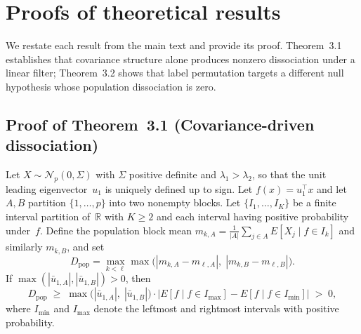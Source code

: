 \documentclass[hidelinks]{siamart251216}
\newcommand{\R}{\mathbb{R}}
\newcommand{\settheoremnum}[1]{\renewcommand{\thetheorem}{#1}}
\begin{document}
\section{Proofs of theoretical results}\label{supp:proofs}

We restate each result from the main text and provide its proof.
Theorem~3.1 establishes that covariance structure alone produces
nonzero dissociation under a linear filter; Theorem~3.2 shows that
label permutation targets a different null hypothesis whose population
dissociation is zero.

\subsection{Proof of Theorem~3.1 (Covariance-driven dissociation)}

\settheoremnum{3.1}
\begin{theorem}
  Let $X \sim \mathcal{N}_p(0, \Sigma)$ with $\Sigma$ positive definite
  and $\lambda_1 > \lambda_2$, so that the unit leading eigenvector~$u_1$ is
  uniquely defined up to sign.  Let $f(x) = u_1^\top x$ and let $A, B$
  partition $\{1, \ldots, p\}$ into two nonempty blocks.
  Let $\{I_1,\ldots,I_K\}$ be a finite interval partition of~$\R$
  with $K \ge 2$ and each interval having positive probability
  under~$f$.  Define the population block mean
  $m_{k,A} = \frac{1}{|A|}\sum_{j \in A} E[X_j \mid f \in I_k]$
  and similarly $m_{k,B}$, and set
  \[
    D_{\mathrm{pop}} = \max_{k < \ell}
    \max\!\bigl(|m_{k,A} - m_{\ell,A}|,\;
    |m_{k,B} - m_{\ell,B}|\bigr).
  \]
  If $\max(|\bar{u}_{1,A}|, |\bar{u}_{1,B}|) > 0$, then
  \[
    D_{\mathrm{pop}} \;\ge\; \max\!\bigl(|\bar{u}_{1,A}|,\;
    |\bar{u}_{1,B}|\bigr) \cdot
    \bigl|E[f \mid f \in I_{\max}] - E[f \mid f \in I_{\min}]\bigr|
    \;>\; 0,
  \]
  where $I_{\min}$ and $I_{\max}$ denote the leftmost and rightmost
  intervals with positive probability.
\end{theorem}
\end{document}
